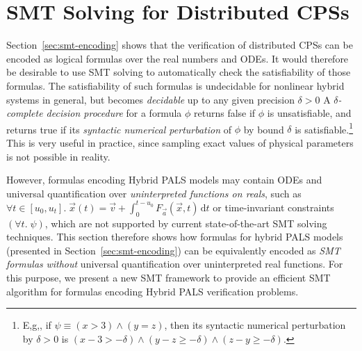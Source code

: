 

\section{SMT Solving for Distributed CPSs}
\label{sec:smt-logic}

Section~\ref{sec:smt-encoding} shows that  the verification of
distributed CPSs 
can be encoded as logical formulas over the real numbers and ODEs. 
It would therefore be desirable to use SMT solving to automatically
check the satisfiability of those formulas. 
%
The satisfiability of such  formulas is undecidable for nonlinear hybrid systems  in general,
but becomes \emph{decidable} up to any given precision $\delta > 0$ 
%
A \emph{$\delta$-complete decision procedure} for a formula $\phi$ returns false 
if $\phi$ is unsatisfiable, and returns true if its \emph{syntactic numerical perturbation} of $\phi$ by bound $\delta$ is
satisfiable.\footnote{E,g,, if $\psi \equiv (x > 3) \wedge (y = z)$, then 
its syntactic numerical perturbation by $\delta> 0$
is $(x - 3 > -\delta) \wedge (y - z \geq -\delta) \wedge (z - y \geq -\delta)$.} 
This is  very useful in practice, since 
sampling exact values of physical parameters is not possible in reality. 

However, formulas encoding Hybrid PALS models
may contain ODEs and universal quantification over \emph{uninterpreted
  functions on reals},
such as 
$\forall t \in [u_0,u_t].\;
\vec{x}(t) = \vec{v} + \int_0^{t-u_0} \!  F_{\vec{a}}(\vec{x},t)\,\mathrm{d}t$
or time-invariant constraints $(\forall t.\; \psi)$,
which are not supported by current state-of-the-art SMT solving techniques.
%
%
This section therefore shows how formulas for hybrid PALS models (presented in Section~\ref{sec:smt-encoding})
can be equivalently encoded as \emph{SMT formulas}
\emph{without}  universal quantification over uninterpreted real functions.
For this purpose, we present a new  SMT framework to provide 
an efficient SMT algorithm
for  formulas encoding Hybrid PALS verification problems.

